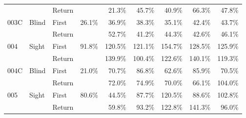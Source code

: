 \begin{table}[!htb]
\begin{tabular}{lllrrrrrr}
    &       & Return &          &   21.3\% &   45.7\% &                                                40.9\% &                                                 66.3\% &   47.8\% \\
003C & Blind & First &   26.1\% &   36.9\% &   38.3\% &                                                35.1\% &                                                 42.4\% &   43.7\% \\
    &       & Return &          &   52.7\% &   41.2\% &                                                44.3\% &                                                 42.6\% &   46.1\% \\
004 & Sight & First &   91.8\% &  120.5\% &  121.1\% &                                               154.7\% &                                                128.5\% &  125.9\% \\
    &       & Return &          &  139.9\% &  100.4\% &                                               122.6\% &                                                140.1\% &  119.3\% \\
004C & Blind & First &   21.0\% &   70.7\% &   86.8\% &                                                62.6\% &                                                 85.9\% &   70.5\% \\
    &       & Return &          &   72.0\% &   74.9\% &                                                70.0\% &                                                 66.1\% &  104.0\% \\
005 & Sight & First &   80.6\% &   44.5\% &   87.7\% &                                               120.5\% &                                                 88.6\% &  102.8\% \\
    &       & Return &          &   59.8\% &   93.2\% &                                               122.8\% &                                                141.3\% &   96.0\% \\
\bottomrule
\end{tabular}
\end{table}

